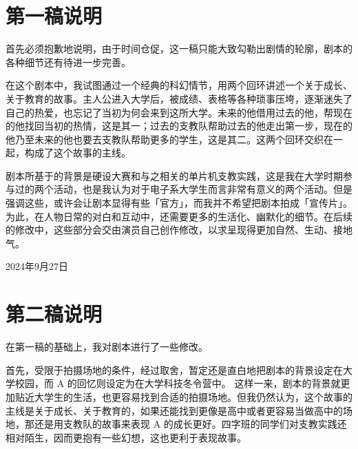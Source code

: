 \documentclass[10pt, a5paper, oneside]{memoir}
\begin{document}
\chapter*{第一稿说明}

首先必须抱歉地说明，由于时间仓促，这一稿只能大致勾勒出剧情的轮廓，剧本的各种细节还有待进一步完善。

在这个剧本中，我试图通过一个经典的科幻情节，用两个回环讲述一个关于成长、关于教育的故事。主人公进入大学后，被成绩、表格等各种琐事压垮，逐渐迷失了自己的热爱，也忘记了当初为何会来到这所大学。未来的他借用过去的他，帮现在的他找回当初的热情，这是其一；过去的支教队帮助过去的他走出第一步，现在的他乃至未来的他也要去支教队帮助更多的学生，这是其二。这两个回环交织在一起，构成了这个故事的主线。

剧本所基于的背景是硬设大赛和与之相关的单片机支教实践，这是我在大学时期参与过的两个活动，也是我认为对于电子系大学生而言非常有意义的两个活动。但是强调这些，或许会让剧本显得有些「官方」，而我并不希望把剧本拍成「宣传片」。为此，在人物日常的对白和互动中，还需要更多的生活化、幽默化的细节。在后续的修改中，这些部分会交由演员自己创作修改，以求呈现得更加自然、生动、接地气。

{\hfill\kai 2024年9月27日}




\chapter*{第二稿说明}

在第一稿的基础上，我对剧本进行了一些修改。

首先，受限于拍摄场地的条件，经过取舍，暂定还是直白地把剧本的背景设定在大学校园，而 A 的回忆则设定为在大学科技冬令营中。
这样一来，剧本的背景就更加贴近大学生的生活，也更容易找到合适的拍摄场地。但我仍然认为，这个故事的主线是关于成长、关于教育的，如果还能找到更像是高中或者更容易当做高中的场地，那还是用支教队的故事来表现 A 的成长更好。四字班的同学们对支教实践还相对陌生，因而更抱有一些幻想，这也更利于表现故事。
\end{document}
